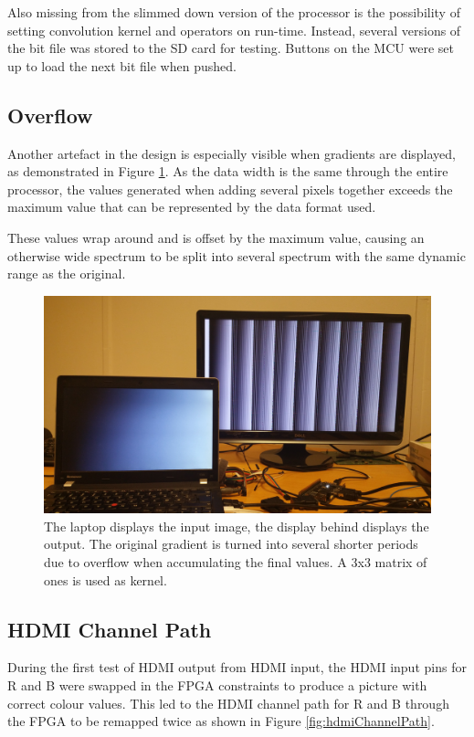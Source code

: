 Also missing from the slimmed down version of the processor is the possibility of setting convolution kernel and operators on run-time.
Instead, several versions of the bit file was stored to the SD card for testing.
Buttons on the MCU were set up to load the next bit file when pushed.

\subsection{Overflow}
Another artefact in the design is especially visible when gradients are displayed, as demonstrated in Figure \ref{fig:Overflow}.
As the data width is the same through the entire processor, the values generated when adding several pixels together exceeds the maximum value that can be represented by the data format used.

These values wrap around and is offset by the maximum value, causing an otherwise wide spectrum to be split into several spectrum with the same dynamic range as the original.

\begin{figure}
    \centering
    \includegraphics[width=14cm]{img/gradient_test}
    \caption[Gradient Output]{
        The laptop displays the input image, the display behind displays the output.
        The original gradient is turned into several shorter periods due to overflow when accumulating the final values.
        A 3x3 matrix of ones is used as kernel.
    }
    \label{fig:Overflow}

\end{figure}

\subsection{HDMI Channel Path}
During the first test of HDMI output from HDMI input,
the HDMI input pins for R and B were swapped in the FPGA constraints to produce a picture with correct colour values.
This led to the HDMI channel path for R and B through the FPGA to be remapped twice as shown in Figure \ref{fig:hdmiChannelPath}.


